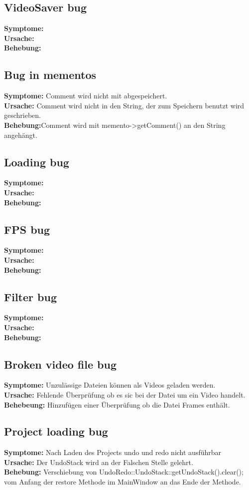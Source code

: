 \documentclass{scrartcl}
\begin{document}
{\subsection{VideoSaver bug}
\textbf{Symptome:}\\
\textbf{Ursache:}\\
\textbf{Behebung:}
\subsection{Bug in mementos}
\textbf{Symptome:} Comment wird nicht mit abgespeichert.\\
\textbf{Ursache:} Comment wird nicht in den String, der zum Speichern benutzt wird geschrieben.\\
\textbf{Behebung:}Comment wird mit memento->getComment() an den String angehängt.
\subsection{Loading bug}
\textbf{Symptome:}\\
\textbf{Ursache:}\\
\textbf{Behebung:}
\subsection{FPS bug}
\textbf{Symptome:}\\
\textbf{Ursache:}\\
\textbf{Behebung:}
\subsection{Filter bug}
\textbf{Symptome:}\\
\textbf{Ursache:}\\
\textbf{Behebung:}
\subsection{Broken video file bug}
\textbf{Symptome:} Unzulässige Dateien können als Videos geladen werden.\\
\textbf{Ursache:} Fehlende Überprüfung ob es sic bei der Datei um ein Video handelt.\\
\textbf{Behebeung:} Hinzufügen einer Überprüfung ob die Datei Frames enthält.
\subsection{Project loading bug}
\textbf{Symptome:} Nach Laden des Projects undo und redo nicht ausführbar\\
\textbf{Ursache:} Der UndoStack wird an der Falschen Stelle gelehrt.\\
\textbf{Behebung:} Verschiebung von UndoRedo::UndoStack::getUndoStack().clear(); vom Anfang der restore Methode im MainWindow an das Ende der Methode.
}
\end{document}
